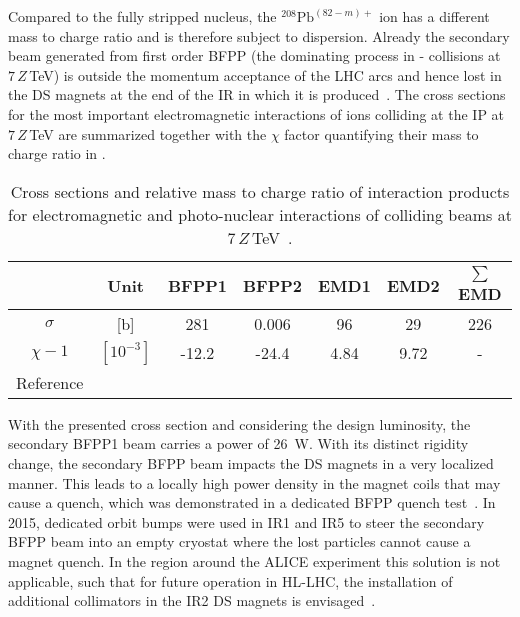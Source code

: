 %
Compared to the fully stripped nucleus, the $^{208}\text{Pb}^{(82-m)+}$ ion has a different mass to charge ratio and is therefore subject to dispersion. Already the secondary beam generated from first order BFPP (the dominating process in \lead - \lead collisions at $7\,Z\,$TeV) is outside the momentum acceptance of the LHC arcs and hence lost in the DS magnets at the end of the IR in which it is produced~\cite{PRSTAB:12:071002}. The cross sections for the most important electromagnetic interactions of \lead ions colliding at the IP at $7\,Z\,$TeV are summarized together with the $\chi$ factor quantifying their mass to charge ratio in . 
\vspace{0.2cm}


\begin{table}[t]
\centering
\caption{Cross sections and relative mass to charge ratio of interaction products for electromagnetic and photo-nuclear interactions of colliding \lead beams at 7$\,Z\,$TeV~\cite{schaum:thesis}.}
\label{tab:BFPP_cross_section}
\begin{tabular}{cc ccccc}
\toprule
 & Unit & BFPP1 & BFPP2 & EMD1 & EMD2 & $\sum$ EMD  \\ \midrule
$\sigma$ &  [b] & 281 & 0.006 & 96  & 29 & 226 \\ 
$\chi-1$ & $[10^{-3}]  $  & -12.2  & -24.4  & 4.84  & 9.72  & - \\ 
\multicolumn{1}{c}{Reference}  &       & \cite{PhysRev:63:Meier}  & \cite{EurPhys:74:Artemyev}  & \cite{PRSTAB:12:071002} & \cite{PRSTAB:12:071002} & \cite{PRSTAB:12:071002}       \\ 
\bottomrule
\end{tabular}
\end{table}

%
With the presented cross section and considering the design luminosity, the secondary BFPP1 beam carries a power of 26~W. With its distinct rigidity change, the secondary BFPP beam impacts the DS magnets in a very localized manner. This leads to a locally high power density in the magnet coils that may cause a quench, which was demonstrated in a dedicated BFPP quench test~\cite{accnote_bfpp_quench}. In 2015, dedicated orbit bumps were used in IR1 and IR5 to steer the secondary BFPP beam into an empty cryostat where the lost particles cannot cause a magnet quench. In the region around the ALICE experiment this solution is not applicable, such that for future operation in HL-LHC, the installation of additional collimators in the IR2 DS magnets is envisaged~\cite{IPAC15:TUPTY028}. 


